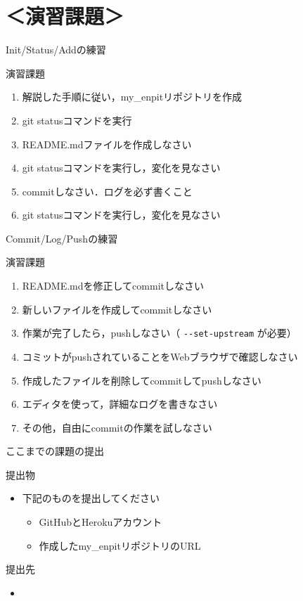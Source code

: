 \documentclass[t, aspectratio=169]{beamer}
\begin{document}
\section{＜演習課題＞}
\label{sec-2-4}
\begin{frame}[label=sec-2-4-1]{Init/Status/Addの練習}
\begin{block}{演習課題}
\begin{enumerate}
\item 解説した手順に従い，my\_enpitリポジトリを作成
\item git statusコマンドを実行
\item README.mdファイルを作成しなさい
\item git statusコマンドを実行し，変化を見なさい
\item commitしなさい．ログを必ず書くこと
\item git statusコマンドを実行し，変化を見なさい
\end{enumerate}
\end{block}
\end{frame}
\begin{frame}[fragile,label=sec-2-4-2]{Commit/Log/Pushの練習}
 \begin{block}{演習課題}
\begin{enumerate}
\item README.mdを修正してcommitしなさい
\item 新しいファイルを作成してcommitしなさい
\item 作業が完了したら，pushしなさい（ \texttt{-{}-set-upstream} が必要）
\item コミットがpushされていることをWebブラウザで確認しなさい
\item 作成したファイルを削除してcommitしてpushしなさい
\item エディタを使って，詳細なログを書きなさい
\item その他，自由にcommitの作業を試しなさい
\end{enumerate}
\end{block}
\end{frame}
\begin{frame}[label=sec-2-4-3]{ここまでの課題の提出}
\begin{block}{提出物}
\begin{itemize}
\item 下記のものを提出してください
\begin{itemize}
\item GitHubとHerokuアカウント
\item 作成したmy\_enpitリポジトリのURL
\end{itemize}
\end{itemize}
\end{block}
\begin{block}{提出先}
\begin{itemize}
\item\relax [\href{https://docs.google.com/forms/d/1SiKQqDLQw2YiJieYVS79ywpHIaNC3uI9cNPb_ddhC1Q/viewform?usp=send_form}{enPiT演習アカウント(2014)}]
\end{itemize}
\end{block}
\end{frame}
\end{document}
